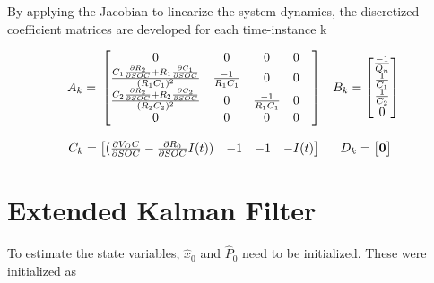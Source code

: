 \documentclass[12pt]{article}
\begin{document}
By applying the Jacobian to linearize the system dynamics, the discretized coefficient matrices are developed for each time-instance k

\begin{equation}
\centering
\begin{matrix}
A_k = \:
\begin{bmatrix}
0 & 0 & 0 & 0 \\
\frac{C_1\frac{\partial{R_2}}{\partial{SOC}} + R_1\frac{\partial{C_1}}{\partial{SOC}}}{(R_1C_1)^2} & \frac{-1}{R_1C_1} & 0 & 0 \\
\frac{C_2\frac{\partial{R_2}}{\partial{SOC}} + R_2\frac{\partial{C_2}}{\partial{SOC}}}{(R_2C_2)^2} & 0 & \frac{-1}{R_1C_1} & 0 \\
0 & 0 & 0 & 0 & \\
\end{bmatrix}
& B_k = 
\begin{bmatrix}
\frac{-1}{Q_n} \\
\frac{1}{C_1} \\
\frac{1}{C_2} \\
0 \\
\end{bmatrix} 

\\ \\

C_k = 
\begin{bmatrix}
(\frac{\partial{V_OC}}{\partial{SOC}} - \frac{\partial{R_0}}{\partial{SOC}}I(t)) & -1 & -1 & -I(t) 
\end{bmatrix} &

D_k = 
\begin{bmatrix}
\bf{0}
\end{bmatrix}
\end{matrix}
\end{equation}

\section{Extended Kalman Filter}

\par
To estimate the state variables, $\hat{x}_0$ and $\hat{P}_0$ need to be initialized. These were initialized as 
\end{document}
